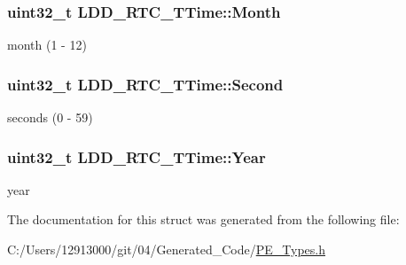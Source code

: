 \subsubsection[{Month}]{\setlength{\rightskip}{0pt plus 5cm}uint32\+\_\+t L\+D\+D\+\_\+\+R\+T\+C\+\_\+\+T\+Time\+::\+Month}\label{struct_l_d_d___r_t_c___t_time_a2de1da3c8e42665975c2469125b04dfd}
month (1 -\/ 12) \hypertarget{struct_l_d_d___r_t_c___t_time_ab6c770706c18542e856d56398850ac9e}{}
\subsubsection[{Second}]{\setlength{\rightskip}{0pt plus 5cm}uint32\+\_\+t L\+D\+D\+\_\+\+R\+T\+C\+\_\+\+T\+Time\+::\+Second}\label{struct_l_d_d___r_t_c___t_time_ab6c770706c18542e856d56398850ac9e}
seconds (0 -\/ 59) \hypertarget{struct_l_d_d___r_t_c___t_time_a16fbfb74b239e4b5e1889fe19d025d5e}{}
\subsubsection[{Year}]{\setlength{\rightskip}{0pt plus 5cm}uint32\+\_\+t L\+D\+D\+\_\+\+R\+T\+C\+\_\+\+T\+Time\+::\+Year}\label{struct_l_d_d___r_t_c___t_time_a16fbfb74b239e4b5e1889fe19d025d5e}
year 

The documentation for this struct was generated from the following file\+:\begin{DoxyCompactItemize}
\item 
C\+:/\+Users/12913000/git/04/\+Generated\+\_\+\+Code/\hyperlink{_p_e___types_8h}{P\+E\+\_\+\+Types.\+h}\end{DoxyCompactItemize}
